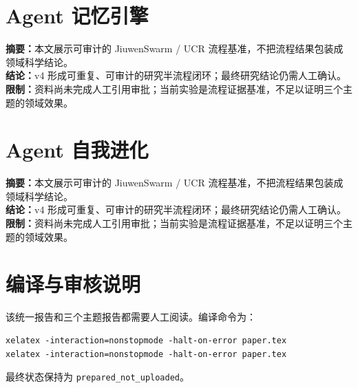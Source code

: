 \documentclass[UTF8]{ctexart}
\begin{document}
\section{Agent 记忆引擎}
\textbf{摘要：}本文展示可审计的 JiuwenSwarm / UCR 流程基准，不把流程结果包装成领域科学结论。\\
\textbf{结论：}v4 形成可重复、可审计的研究半流程闭环；最终研究结论仍需人工确认。\\
\textbf{限制：}资料尚未完成人工引用审批；当前实验是流程证据基准，不足以证明三个主题的领域效果。
\section{Agent 自我进化}
\textbf{摘要：}本文展示可审计的 JiuwenSwarm / UCR 流程基准，不把流程结果包装成领域科学结论。\\
\textbf{结论：}v4 形成可重复、可审计的研究半流程闭环；最终研究结论仍需人工确认。\\
\textbf{限制：}资料尚未完成人工引用审批；当前实验是流程证据基准，不足以证明三个主题的领域效果。
\section{编译与审核说明}
该统一报告和三个主题报告都需要人工阅读。编译命令为：
\begin{verbatim}
xelatex -interaction=nonstopmode -halt-on-error paper.tex
xelatex -interaction=nonstopmode -halt-on-error paper.tex
\end{verbatim}
最终状态保持为 \texttt{prepared\_not\_uploaded}。
\end{document}
